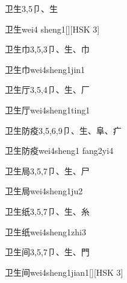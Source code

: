 \begin{entry}{卫生}{3,5}{⼙、⽣}
  \begin{phonetics}{卫生}{wei4 sheng1}[][HSK 3]
  \end{phonetics}
\end{entry}

\begin{entry}{卫生巾}{3,5,3}{⼙、⽣、⼱}
  \begin{phonetics}{卫生巾}{wei4sheng1jin1}
  \end{phonetics}
\end{entry}

\begin{entry}{卫生厅}{3,5,4}{⼙、⽣、⼚}
  \begin{phonetics}{卫生厅}{wei4sheng1ting1}
  \end{phonetics}
\end{entry}

\begin{entry}{卫生防疫}{3,5,6,9}{⼙、⽣、⾩、⽧}
  \begin{phonetics}{卫生防疫}{wei4sheng1 fang2yi4}
  \end{phonetics}
\end{entry}

\begin{entry}{卫生局}{3,5,7}{⼙、⽣、⼫}
  \begin{phonetics}{卫生局}{wei4sheng1ju2}
  \end{phonetics}
\end{entry}

\begin{entry}{卫生纸}{3,5,7}{⼙、⽣、⽷}
  \begin{phonetics}{卫生纸}{wei4sheng1zhi3}
  \end{phonetics}
\end{entry}

\begin{entry}{卫生间}{3,5,7}{⼙、⽣、⾨}
  \begin{phonetics}{卫生间}{wei4sheng1jian1}[][HSK 3]
  \end{phonetics}
\end{entry}

